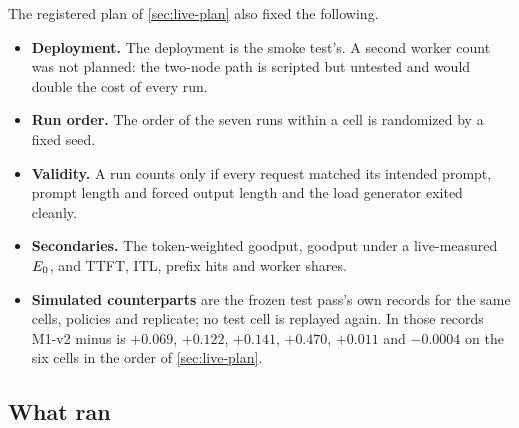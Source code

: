 The registered plan of \cref{sec:live-plan} also fixed the following.
\begin{itemize}
  \item \textbf{Deployment.} The deployment is the smoke test's. A second worker count was not
    planned: the two-node path is scripted but untested and would double the cost of every run.
  \item \textbf{Run order.} The order of the seven runs within a cell is randomized by a fixed seed.
  \item \textbf{Validity.} A run counts only if every request matched its intended prompt, prompt
    length and forced output length and the load generator exited cleanly.
  \item \textbf{Secondaries.} The token-weighted goodput, goodput under a live-measured $E_0$,
    and TTFT, ITL, prefix hits and worker shares.
  \item \textbf{Simulated counterparts} are the frozen test pass's own records for the same cells,
    policies and replicate; no test cell is replayed again. In those records M1-v2 minus
     is $+0.069$, $+0.122$, $+0.141$, $+0.470$, $+0.011$ and $-0.0004$ on the six cells
    in the order of \cref{sec:live-plan}.
\end{itemize}

\subsection{What ran}

